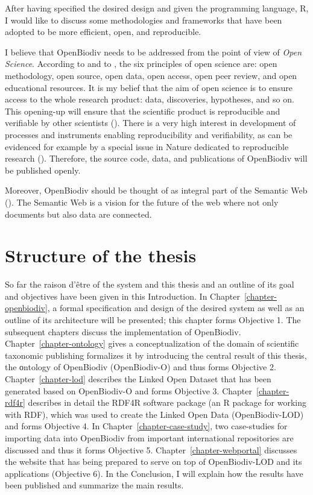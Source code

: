 After having specified the desired design and given the programming language, R, I would like to discuss some methodologies and frameworks that have been adopted to be more efficient, open, and reproducible.

I believe that OpenBiodiv needs to be addressed from the point of view of \emph{Open Science}. According to \cite{kraker_case_2011} and to \cite{noauthor_was_nodate}, the six principles of open science are: open methodology, open source, open data, open access, open peer review, and open educational resources. It is my belief that the aim of open science is to ensure access to the whole research product: data, discoveries, hypotheses, and so on. This opening-up will ensure that the scientific product is reproducible and verifiable by other scientists (\cite{mietchen_transformative_2014}). There is a very high interest in development of processes and instruments enabling reproducibility and verifiability, as can be evidenced for example by a special issue in Nature dedicated to reproducible research (\cite{noauthor_challenges_2010}). Therefore, the source code, data, and publications of OpenBiodiv will be published openly.

Moreover, OpenBiodiv should be thought of as integral part of the Semantic Web (\cite{berners-lee_semantic_2001}). The Semantic Web is a vision for the future of the web where not only documents but also data are connected.

\section*{Structure of the thesis}

So far the raison d'\^etre of the system and this thesis and an outline of its goal and objectives have been given in this Introduction.
In Chapter~\ref{chapter-openbiodiv}, a formal specification and design of the desired system as well as an outline of its architecture will be presented; this chapter forms Objective 1. The subsequent chapters discuss the implementation of OpenBiodiv. Chapter~\ref{chapter-ontology} gives a conceptualization of the domain of scientific taxonomic publishing formalizes it by introducing the central result of this thesis, the оntology of OpenBiodiv (OpenBiodiv-O) and thus forms Objective 2. Chapter~\ref{chapter-lod} describes the Linked Open Dataset that has been generated based on OpenBiodiv-O and forms Objective 3. Chapter~\ref{chapter-rdf4r} describes in detail the RDF4R software package (an R package for working with RDF), which was used to create the Linked Open Data (OpenBiodiv-LOD) and forms Objective 4. In Chapter~\ref{chapter-case-study}, two case-studies for importing data into OpenBiodiv from important international repositories are discussed and thus it forms Objective 5. Chapter~\ref{chapter-webportal} discusses the website that has being prepared to serve on top of OpenBiodiv-LOD and its applications (Objective 6).
In the Conclusion, I will explain how the results have been published and summarize the main results.





